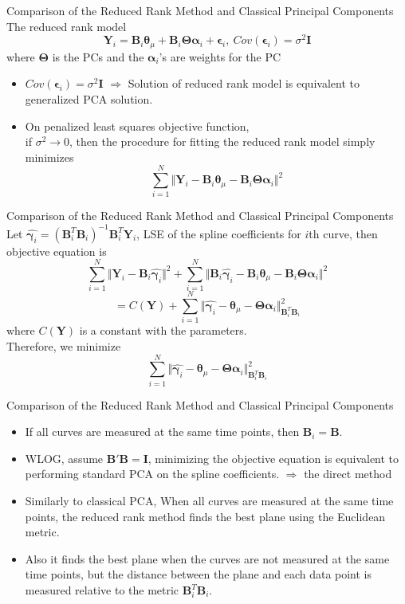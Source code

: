 \documentclass{beamer}
\def \bY {\mathbf{Y}}
\def \bB {\mathbf{B}}
\def \btheta {\boldsymbol{\theta}}
\def \bTheta {\boldsymbol{\Theta}}
\def \bepsilon {\boldsymbol{\epsilon}}
\def \balpha {\boldsymbol{\alpha}}
\def \bgamma {\boldsymbol{\gamma}}
\begin{document}
\begin{frame}{Comparison of the Reduced Rank Method and Classical Principal Components}
	The reduced rank model
	$$ \bY_i = \mathbf{B}_i\btheta_{\mu}+\mathbf{B}_i\bTheta\balpha_i + \bepsilon_i, \ Cov(\bepsilon_i)=\sigma^2\mathbf{I} $$
	where $\bTheta$ is the PCs and the $\balpha_i$'s are weights for the PC
	\begin{itemize}
		\item {
			$Cov(\bepsilon_i)=\sigma^2 \mathbf{I}$ $\Rightarrow$ Solution of reduced rank model is equivalent to generalized PCA solution.
		}
		\item {
			On penalized least squares objective function,\\ if $\sigma^2 \rightarrow 0$, then the procedure for fitting the reduced rank model simply minimizes
		$$ \sum_{i=1}^N \Vert \bY_i - \mathbf{B}_i\btheta_{\mu} - \mathbf{B}_i\bTheta\balpha_i \Vert^2  $$
		}
	\end{itemize}
\end{frame}

\begin{frame}{Comparison of the Reduced Rank Method and Classical Principal Components}
	Let $\hat{\bgamma_i}=(\mathbf{B}^T_i\mathbf{B}_i)^{-1}\mathbf{B}^T_i\bY_i$, LSE of the spline coefficients for $i$th curve, then objective equation is
	$$ \sum_{i=1}^N \Vert \bY_i - \mathbf{B}_i\hat{\bgamma_i} \Vert^2 + \sum_{i=1}^N \Vert \mathbf{B}_i\hat{\bgamma_i} - \mathbf{B}_i\btheta_{\mu} - \mathbf{B}_i\bTheta\balpha_i \Vert^2  $$
	$$ = C(\bY) + \sum_{i=1}^N \Vert \hat{\bgamma_i} - \btheta_{\mu} - \bTheta\balpha_i \Vert_{\mathbf{B}^T_i\mathbf{B}_i}^2 $$
	where $C(\bY)$ is a constant with the parameters.\\
	Therefore, we minimize
	$$ \sum_{i=1}^N \Vert \hat{\bgamma_i} - \btheta_{\mu} - \bTheta\balpha_i \Vert_{\mathbf{B}^T_i\mathbf{B}_i}^2 $$
\end{frame}

\begin{frame}{Comparison of the Reduced Rank Method and Classical Principal Components}
	\begin{itemize}
		\item {
			If all curves are measured at the same time points, then $\mathbf{B}_i=\mathbf{B}$.
		}
		\item {
			WLOG, assume $\mathbf{B'B=I}$, minimizing the objective equation is equivalent to performing standard PCA on the spline coefficients. $\Rightarrow$ the direct method
		}
		\item {
			Similarly to classical PCA, When all curves are measured at the same time points, the reduced rank method finds the best plane using the Euclidean metric.
		}
		\item {
			Also it finds the best plane when the curves are not measured at the same time points, but the distance between the plane and each data point is measured relative to the metric $\bB_i^T\bB_i$.
		}
	\end{itemize}
\end{frame}
\end{document}
